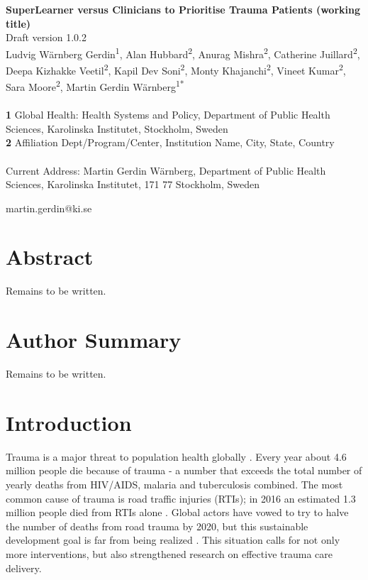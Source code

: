 \documentclass[10pt,letterpaper]{article}\usepackage[]{graphicx}\usepackage[]{color}
\begin{document}
{\Large
  \noindent\textbf{SuperLearner versus Clinicians to Prioritise Trauma Patients (working title)}
} \newline
\\
{\large
  Draft version 1.0.2
}
\newline
\\
Ludvig Wärnberg Gerdin\textsuperscript{1}, %
Alan Hubbard\textsuperscript{2}, 
Anurag Mishra\textsuperscript{2}, 
Catherine Juillard\textsuperscript{2}, %
Deepa Kizhakke Veetil\textsuperscript{2}, 
Kapil Dev Soni\textsuperscript{2}, 
Monty Khajanchi\textsuperscript{2},
Vineet Kumar\textsuperscript{2},
Sara Moore\textsuperscript{2},
Martin Gerdin Wärnberg\textsuperscript{1*\textcurrency}
\\
\bigskip
\\
\textbf{1} Global Health: Health Systems and Policy, Department of Public Health Sciences, Karolinska Institutet, Stockholm, Sweden
\\
\textbf{2} Affiliation Dept/Program/Center, Institution Name, City, State,
Country
\\
\bigskip
\\
\textcurrency Current Address: Martin Gerdin Wärnberg, Department of Public
Health Sciences, Karolinska Institutet, 171 77 Stockholm, Sweden

\noindent * martin.gerdin@ki.se
\section*{Abstract}
Remains to be written.
\section*{Author Summary}
Remains to be written.
\section*{Introduction}
Trauma is a major threat to population health globally
\cite{Brohi2017,GBD2017}. Every year about 4.6 million people die because of
trauma - a number that exceeds the total number of yearly deaths from HIV/AIDS,
malaria and tuberculosis combined. The most common cause of trauma is road
traffic injuries (RTIs); in 2016 an estimated 1.3 million people died from RTIs
alone \cite{GBD2017}. Global actors have vowed to try to halve the number of
deaths from road trauma by 2020, but this sustainable development goal is far
from being realized \cite{UN2018}. This situation calls for not only more
interventions, but also strengthened research on effective trauma care delivery.
\end{document}

